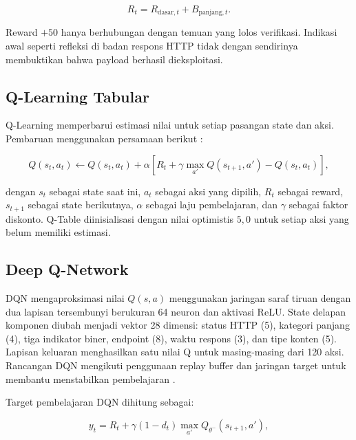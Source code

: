 \begin{equation}
R_t = R_{\text{dasar},t} + B_{\text{panjang},t}.
\label{eq:reward}
\end{equation}

Reward \(+50\) hanya berhubungan dengan temuan yang lolos verifikasi. Indikasi awal seperti refleksi di badan respons HTTP tidak dengan sendirinya membuktikan bahwa payload berhasil dieksploitasi.

\subsection{Q-Learning Tabular}

Q-Learning memperbarui estimasi nilai untuk setiap pasangan state dan aksi. Pembaruan menggunakan persamaan berikut \cite{watkins1992qlearning,sutton2018}:

\begin{equation}
Q(s_t,a_t) \leftarrow Q(s_t,a_t)
+ \alpha \left[
R_t + \gamma \max_{a'} Q(s_{t+1},a') - Q(s_t,a_t)
\right],
\label{eq:qlearning}
\end{equation}

dengan \(s_t\) sebagai state saat ini, \(a_t\) sebagai aksi yang dipilih, \(R_t\) sebagai reward, \(s_{t+1}\) sebagai state berikutnya, \(\alpha\) sebagai laju pembelajaran, dan \(\gamma\) sebagai faktor diskonto. Q-Table diinisialisasi dengan nilai optimistis \(5{,}0\) untuk setiap aksi yang belum memiliki estimasi.

\subsection{Deep Q-Network}

DQN mengaproksimasi nilai \(Q(s,a)\) menggunakan jaringan saraf tiruan dengan dua lapisan tersembunyi berukuran 64 neuron dan aktivasi ReLU. State delapan komponen diubah menjadi vektor 28 dimensi: status HTTP (5), kategori panjang (4), tiga indikator biner, endpoint (8), waktu respons (3), dan tipe konten (5). Lapisan keluaran menghasilkan satu nilai Q untuk masing-masing dari 120 aksi. Rancangan DQN mengikuti penggunaan replay buffer dan jaringan target untuk membantu menstabilkan pembelajaran \cite{mnih2015dqn}.

Target pembelajaran DQN dihitung sebagai:

\begin{equation}
y_t = R_t + \gamma(1-d_t)
\max_{a'} Q_{\theta^-}(s_{t+1},a'),
\label{eq:dqn_target}
\end{equation}

